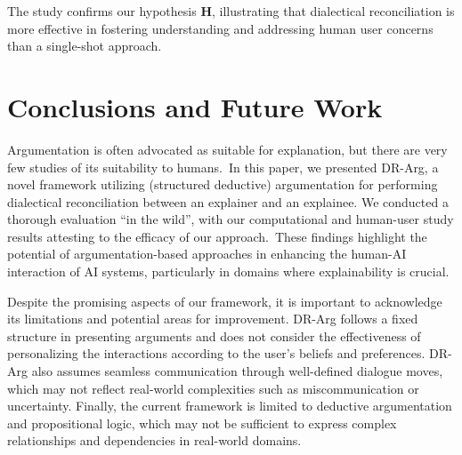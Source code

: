\documentclass{article}
\begin{document}
The study confirms our hypothesis \textbf{H}, illustrating that dialectical reconciliation is more effective in fostering understanding and addressing human user concerns than a single-shot approach. 













\section{Conclusions and Future Work}
\label{concl}

Argumentation is often advocated as suitable for explanation, but there are very few studies of its suitability to humans.~In this paper, we presented DR-Arg, a novel framework utilizing (structured deductive) argumentation for performing dialectical reconciliation between an explainer and an explainee. We conducted a thorough evaluation ``in the wild'', with our computational and human-user study results attesting to the efficacy of our approach.~These findings highlight the potential of argumentation-based approaches in enhancing the human-AI interaction of AI systems, particularly in domains where explainability is crucial.  





Despite the promising aspects of our framework, it is important to acknowledge its limitations and potential areas for improvement. DR-Arg follows a fixed structure in presenting arguments and does not consider the effectiveness of personalizing the interactions according to the user's beliefs and preferences. DR-Arg also assumes seamless communication through well-defined dialogue moves, which may not reflect real-world complexities such as miscommunication or uncertainty. Finally, the current framework is limited to deductive argumentation and propositional logic, which may not be sufficient to express complex relationships and dependencies in real-world domains.
\end{document}

